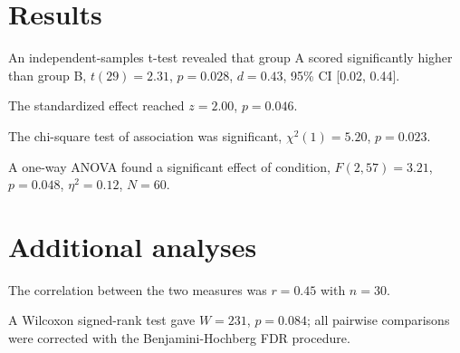 \section{Results}

An independent-samples t-test revealed that group A scored significantly
higher than group B, $t(29) = 2.31$, $p = 0.028$, $d = 0.43$, 95\% CI [0.02, 0.44].

The standardized effect reached $z = 2.00$, $p = 0.046$.

The chi-square test of association was significant, $\chi^2(1) = 5.20$, $p = 0.023$.

A one-way ANOVA found a significant effect of condition,
$F(2, 57) = 3.21$, $p = 0.048$, $\eta^2 = 0.12$, $N = 60$.

\section{Additional analyses}

The correlation between the two measures was $r = 0.45$ with $n = 30$.

A Wilcoxon signed-rank test gave $W = 231$, $p = 0.084$; all pairwise
comparisons were corrected with the Benjamini-Hochberg FDR procedure.
